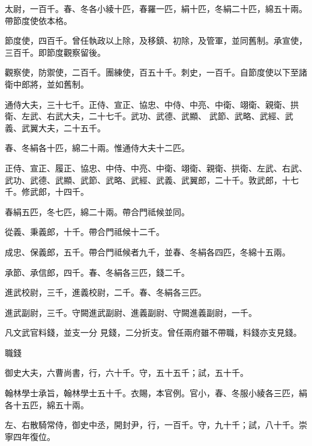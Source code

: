 \begin{pinyinscope}
 太尉，一百千。春、冬各小綾十匹，春羅一匹，絹十匹，冬絹二十匹，綿五十兩。帶節度使依本格。



 節度使，四百千。曾任執政以上除，及移鎮、初除，及管軍，並同舊制。承宣使，三百千。即節度觀察留後。



 觀察使，防禦使，二百千。團練使，百五十千。刺史，一百千。自節度使以下至諸衛中郎將，並如舊制。



 通侍大夫，三十七千。正侍、宣正、協忠、中侍、中亮、中衛、翊衛、親衛、拱衛、左武、右武大夫，二十七千。武功、武德、武顯、
 武節、武略、武經、武義、武翼大夫，二十五千。



 春、冬絹各十匹，綿二十兩。惟通侍大夫十二匹。



 正侍、宣正、履正、協忠、中侍、中亮、中衛、翊衛、親衛、拱衛、左武、右武、武功、武德、武顯、武節、武略、武經、武義、武翼郎，二十千。敦武郎，十七千。修武郎，十四千。



 春絹五匹，冬七匹，綿二十兩。帶合門祗候並同。



 從義、秉義郎，十千。帶合門祗候十二千。



 成忠、保義郎，五千。帶合門祗候者九千，並春、冬絹各四匹，冬綿十五兩。



 承節、承信郎，四千。春、冬絹各三匹，錢二千。



 進武校尉，三千，進義校尉，二千。春、冬絹各三匹。



 進武副尉，三千。守闕進武副尉、進義副尉、守闕進義副尉，一千。



 凡文武官料錢，並支一分
 見錢，二分折支。曾任兩府雖不帶職，料錢亦支見錢。



 職錢



 御史大夫，六曹尚書，行，六十千。守，五十五千；試，五十千。



 翰林學士承旨，翰林學士五十千。衣賜，本官例。官小，春、冬服小綾各三匹，絹各十五匹，綿五十兩。



 左、右散騎常侍，御史中丞，開封尹，行，一百千。守，九十千；試，八十千。崇寧四年復位。




\end{pinyinscope}
